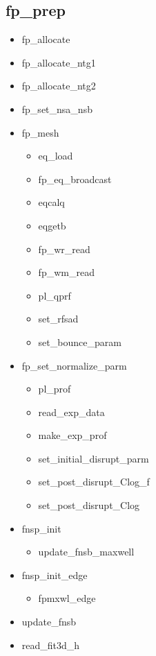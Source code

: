 \documentclass[11pt]{article}
\begin{document}
\subsection{fp\_prep}
  \begin{itemize}
  \item
    fp\_allocate
  \item
    fp\_allocate\_ntg1
  \item
    fp\_allocate\_ntg2
  \item
    fp\_set\_nsa\_nsb
  \item
    fp\_mesh
    \begin{itemize}
    \item
      eq\_load
    \item
      fp\_eq\_broadcast
    \item
      eqcalq
    \item
      eqgetb
    \item
      fp\_wr\_read
    \item
      fp\_wm\_read
    \item
      pl\_qprf
    \item
      set\_rfsad
    \item
      set\_bounce\_param
    \end{itemize}
  \item
    fp\_set\_normalize\_parm
    \begin{itemize}
    \item
      pl\_prof
    \item
      read\_exp\_data
    \item
      make\_exp\_prof
    \item
      set\_initial\_disrupt\_parm
    \item
      set\_post\_disrupt\_Clog\_f
    \item
      set\_post\_disrupt\_Clog
    \end{itemize}
  \item
    fnsp\_init
    \begin{itemize}
    \item
      update\_fnsb\_maxwell
    \end{itemize}
  \item
    fnsp\_init\_edge
    \begin{itemize}
    \item
      fpmxwl\_edge
    \end{itemize}
  \item
    update\_fnsb
  \item
    read\_fit3d\_h

\end{itemize}
\end{document}
